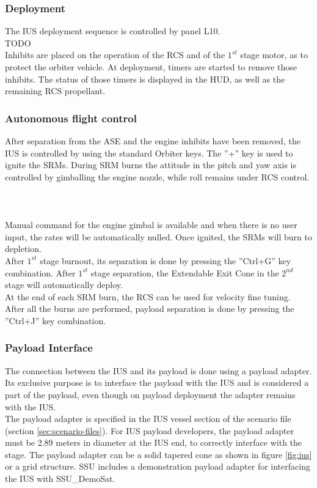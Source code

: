 \documentclass[Space_Shuttle_Ultra_Manual.tex]{subfiles}
\begin{document}
\begin{multicols*}{2}
\subsubsection{Deployment}
The IUS deployment sequence is controlled by panel L10.
\\
TODO
\\
Inhibits are placed on the operation of the RCS and of the $1^{st}$ stage motor, as to protect the orbiter vehicle. At deployment, timers are started to remove those inhibits. The status of those timers is displayed in the HUD, as well as the remaining RCS propellant.

\subsubsection{Autonomous flight control}
After separation from the ASE and the engine inhibits have been removed, the IUS is controlled by using the standard Orbiter keys. The ''+'' key is used to ignite the SRMs. During SRM burns the attitude in the pitch and yaw axis is controlled by gimballing the engine nozzle, while roll remains under RCS control.
\\
\\
\\
\\
Manual command for the engine gimbal is available and when there is no user input, the rates will be automatically nulled. Once ignited, the SRMs will burn to depletion.\\
After $1^{st}$ stage burnout, its separation is done by pressing the ''Ctrl+G'' key combination. After $1^{st}$ stage separation, the Extendable Exit Cone in the $2^{nd}$ stage will automatically deploy.\\
At the end of each SRM burn, the RCS can be used for velocity fine tuning.\\
After all the burns are performed, payload separation is done by pressing the ''Ctrl+J'' key combination.

\subsubsection{Payload Interface}
The connection between the IUS and its payload is done using a payload adapter. Its exclusive purpose is to interface the payload with the IUS and is considered a part of the payload, even though on payload deployment the adapter remains with the IUS.\\
The payload adapter is specified in the IUS vessel section of the scenario file (section \ref{sec:scenario-files}).
For IUS payload developers, the payload adapter must be 2.89 meters in diameter at the IUS end, to correctly interface with the stage. The payload adapter can be a solid tapered cone as shown in figure \ref{fig:ius} or a grid structure. SSU includes a demonstration payload adapter for interfacing the IUS with SSU\_DemoSat.\\

\end{multicols*}
\end{document}
